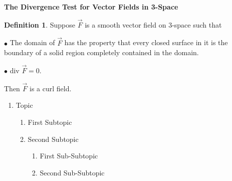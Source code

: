 \documentclass[12pt, a4paper]{article}
\theoremstyle{plain}
\theoremstyle{definition}
\newtheorem{definition}{Definition}[section]
\theoremstyle{remark}
\begin{document}
\textbf{The Divergence Test for Vector Fields in 3-Space}

\begin{definition}
Suppose $\vec{F}$ is a smooth vector field on 3-space such that 

$\bullet$ The domain of $\vec{F}$ has the property that every closed surface in it is the boundary of a solid region completely contained in the domain.

$\bullet$ div $\vec{F} = 0$.

Then $\vec{F}$ is a curl field. 
\end{definition}




















\newpage


\begin{center}
\end{center}






\begin{enumerate}
  \item Topic
  \begin{enumerate}[label*=\arabic*.]
    \item First Subtopic
    \item Second Subtopic
    \begin{enumerate}[label*=\arabic*.]
      \item First Sub-Subtopic
      \item Second Sub-Subtopic
    \end{enumerate}
  \end{enumerate}
\end{enumerate}
\end{document}
